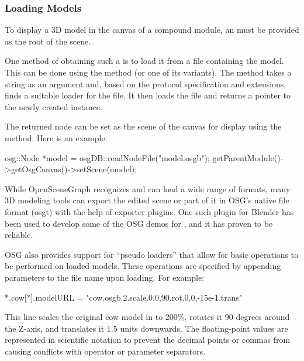 \subsubsection{Loading Models}
\label{sec:graphics:osg-loading-models}

To display a 3D model in the canvas of a compound module, an 
must be provided as the root of the scene.

One method of obtaining such a  is to load it from a file containing
the model. This can be done using the  method (or
one of its variants). The method takes a string as an argument and, based on the
protocol specification and extensions, finds a suitable loader for the file. It
then loads the file and returns a pointer to the newly created
 instance.

The returned node can be set as the scene of the canvas for display using the
 method. Here is an example:

\begin{cpp}
osg::Node *model = osgDB::readNodeFile("model.osgb");
getParentModule()->getOsgCanvas()->setScene(model);
\end{cpp}

\begin{note}
 While OpenSceneGraph recognizes and can load a
wide range of formats, many 3D modeling tools can export the edited scene or
part of it in OSG's native file format (osgt) with the help of exporter plugins.
One such plugin for Blender has been used to develop some of the OSG demos for
{\opp}, and it has proven to be reliable.
\end{note}

OSG also provides support for ``pseudo loaders'' that allow for basic operations
to be performed on loaded models. These operations are specified by appending
parameters to the file name upon loading. For example:

\begin{inifile}
*.cow[*].modelURL = "cow.osgb.2.scale.0,0,90.rot.0,0,-15e-1.trans"
\end{inifile}

This line scales the original cow model in  to 200\%, rotates it
90 degrees around the Z-axis, and translates it 1.5 units downwards. The
floating-point values are represented in scientific notation to prevent the decimal
points or commas from causing conflicts with operator or parameter separators.

